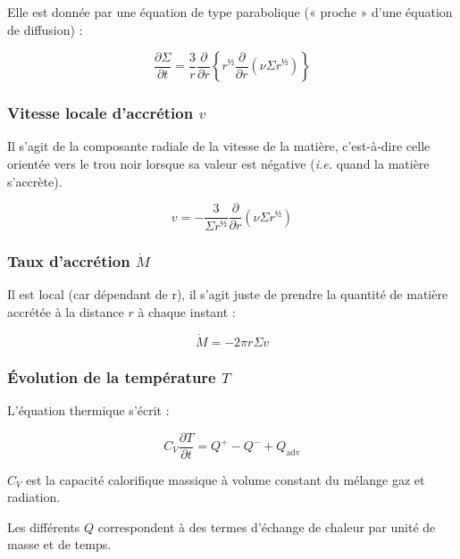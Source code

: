 Elle est donnée par une équation de type parabolique (« proche » d’une équation
de diffusion) :

\begin{equation}
    \label{eq:densite_surface}
    \frac{\partial \Sigma}{\partial t} = \frac{3}{r} \frac{\partial}{\partial r} \left\{ r^½ \frac{\partial}{\partial r} \left(\nu \Sigma r^½ \right) \right\}
\end{equation}

\subsubsection{Vitesse locale d’accrétion $v$}

Il s’agit de la composante radiale de la vitesse de la matière, c’est-à-dire
celle orientée vers le trou noir lorsque sa valeur est négative (\textit{i.e.}
quand la matière s’accrète).

\begin{equation}
    \label{eq:vitesse_accretion}
    v = - \frac{3}{\Sigma r^½} \frac{\partial}{\partial r} \left( \nu \Sigma r^½ \right)
\end{equation}

\subsubsection{Taux d’accrétion $\dot{M}$}

Il est local (car dépendant de r), il s’agit juste de prendre la quantité de
matière accrétée à la distance $r$ à chaque instant :

\begin{equation}
    \label{eq:taux_accretion}
    \dot{M} = - 2 \pi r \Sigma v
\end{equation}

\subsubsection{Évolution de la température \texorpdfstring{$T$}{\textit{T}}}

L’équation thermique s’écrit :

\begin{equation}
    \label{eq:equation_thermique}
    C_V \frac{\partial T}{\partial t} = Q^+ - Q^- + Q_\mathrm{adv}
\end{equation}

$C_V$ est la capacité calorifique massique à volume constant du mélange gaz et
radiation.

Les différents $Q$ correspondent à des termes d’échange de chaleur par unité de
masse et de temps.

